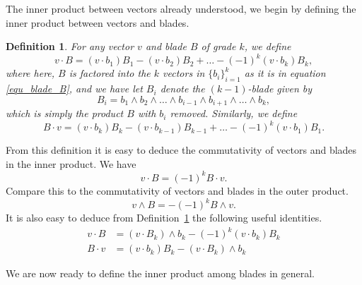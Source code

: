 \documentclass[12pt]{article}
\numberwithin{equation}{section}
\newtheorem{definition}{Definition}[section]
\begin{document}
The inner product between vectors already understood, we begin
by defining the inner product between vectors and blades.

\begin{definition}\label{def_vec_blade_inner_prod}
For any vector $v$ and blade $B$ of grade $k$, we define
\begin{equation}\label{equ_v_dot_B_expanded}
v\cdot B = (v\cdot b_1)B_1 - (v\cdot b_2)B_2 + \dots - (-1)^k(v\cdot b_k)B_k,
\end{equation}
where here, $B$ is factored into the $k$ vectors in $\{b_i\}_{i=1}^k$ as it
is in equation \eqref{equ_blade_B}, and we have let $B_i$ denote the $(k-1)$-blade
given by
\begin{equation}
B_i = b_1\wedge b_2\wedge\dots\wedge b_{i-1}\wedge b_{i+1}\wedge\dots\wedge b_k,
\end{equation}
which is simply the product $B$ with $b_i$ removed.  Similarly, we define
\begin{equation}
B\cdot v = (v\cdot b_k)B_k - (v\cdot b_{k-1})B_{k-1} +\dots - (-1)^k(v\cdot b_1)B_1.
\end{equation}
\end{definition}
From this definition it is easy to deduce the commutativity of vectors and
blades in the inner product.  We have
\begin{equation}
v\cdot B = (-1)^k B\cdot v.
\end{equation}
Compare this to the commutativity of vectors and blades in the outer product.
\begin{equation}
v\wedge B = -(-1)^k B\wedge v.
\end{equation}
It is also easy to deduce from Definition~\ref{def_vec_blade_inner_prod} the
following useful identities.
\begin{align}
v\cdot B &= (v\cdot B_k)\wedge b_k-(-1)^k(v\cdot b_k)B_k\label{equ_v_dot_B_recursive_ident} \\
B\cdot v &= (v\cdot b_k)B_k - (v\cdot B_k)\wedge b_k
\end{align}

We are now ready to define the inner product among blades
in general.
\end{document}
